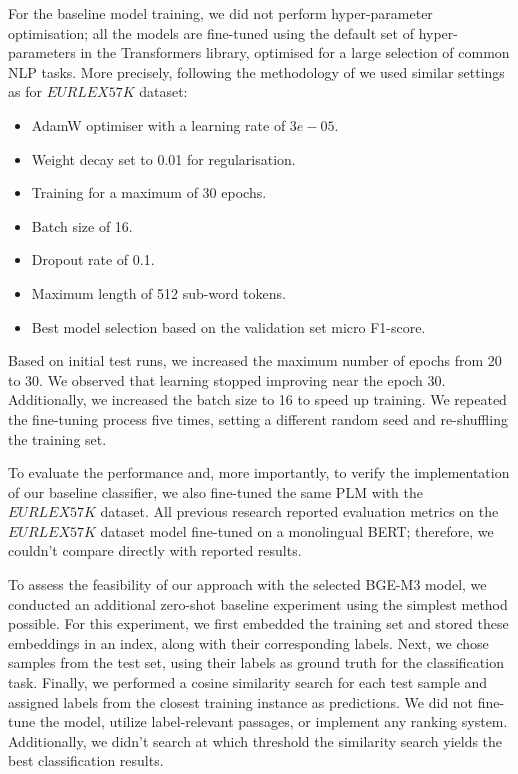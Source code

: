 For the baseline model training, we did not perform hyper-parameter optimisation; all the models are fine-tuned using the default set of hyper-parameters in the Transformers library, optimised for a large selection of common NLP tasks.
More precisely, following the methodology of \textcite{park2022efficient, chalkidis-etal-2019-large} we used similar settings as for $EURLEX57K$ dataset:
\begin{itemize}\itemsep=0pt
  \item AdamW optimiser with a learning rate of $3e-05$.
  \item Weight decay set to 0.01 for regularisation.
  \item Training for a maximum of 30 epochs.
  \item Batch size of 16.
  \item Dropout rate of 0.1.
  \item Maximum length of 512 sub-word tokens.
  \item Best model selection based on the validation set micro F1-score.
\end{itemize}
Based on initial test runs, we increased the maximum number of epochs from 20 to 30. 
We observed that learning stopped improving near the epoch 30.
Additionally, we increased the batch size to 16 to speed up training.
We repeated the fine-tuning process five times, setting a different random seed and re-shuffling the training set.

To evaluate the performance and, more importantly, to verify the implementation of our baseline classifier, we also fine-tuned the same PLM with the $EURLEX57K$ dataset.
All previous research reported evaluation metrics on the $EURLEX57K$ dataset model fine-tuned on a monolingual BERT; therefore, we couldn't compare directly with reported results.

To assess the feasibility of our approach with the selected BGE-M3 model, we conducted an additional zero-shot baseline experiment using the simplest method possible. 
For this experiment, we first embedded the training set and stored these embeddings in an index, along with their corresponding labels. 
Next, we chose samples from the test set, using their labels as ground truth for the classification task. 
Finally, we performed a cosine similarity search for each test sample and assigned labels from the closest training instance as predictions. 
We did not fine-tune the model, utilize label-relevant passages, or implement any ranking system.
Additionally, we didn't search at which threshold the similarity search yields the best classification results.

